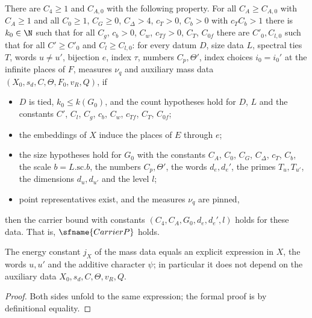 \begin{theorem}\label{pf:thmS-carrier:main}
There are $C_4\ge1$ and $C_{A,0}$ with the following property. For all $C_A\ge C_{A,0}$ with $C_A\ge1$ and all $C_0\ge1$,
$C_G\ge0$, $C_\Delta>4$, $c_T>0$, $C_b>0$ with $c_TC_b>1$ there is $k_0\in\N$ such that for all $C_g$, $c_b>0$, $C_w$,
$c_{Tf}>0$, $C_T$, $C_{0f}$ there are $C'_0,C_{l,0}$ such that for all $C'\ge C'_0$ and $C_l\ge C_{l,0}$: for every datum
$D$, size data $L$, spectral ties $T$, words $u\ne u'$, bijection $e$, index $\tau$, numbers $C_p,\Theta'$, index choices
$i_0=i_0'$ at the infinite places of $F$, measures $\nu_q$ and auxiliary mass data $(X_0,s_d,C,\Theta,F_0,v_R,Q)$, if
\begin{itemize}
\item $D$ is tied, $k_0\le k(G_0)$, and the count hypotheses hold for $D$, $L$ and the constants $C'$, $C_l$, $C_g$, $c_b$,
  $C_w$, $c_{Tf}$, $C_T$, $C_{0f}$;
\item the embeddings of $X$ induce the places of $E$ through $e$;
\item the size hypotheses hold for $G_0$ with the constants $C_A$, $C_0$, $C_G$, $C_\Delta$, $c_T$, $C_b$, the scale
  $b=L.\mathrm{sc}.b$, the numbers $C_p,\Theta'$, the words $d_e,d_e'$, the primes $T_u,T_{u'}$, the dimensions
  $d_u,d_{u'}$ and the level $l$;
\item point representatives exist, and the measures $\nu_q$ are pinned,
\end{itemize}
then the carrier bound with constants $(C_4,C_A,G_0,d_e,d_e',l)$ holds for these data. That is, $\sfname{CarrierP}$ holds.
\end{theorem}

\begin{lemma}\label{pf:thmS-carrier:intN}
The energy constant $j_X$ of the mass data equals an explicit expression in $X$, the words $u,u'$ and the additive
character $\psi$; in particular it does not depend
on the auxiliary data $X_0,s_d,C,\Theta,v_R,Q$.
\end{lemma}

\begin{proof}
Both sides unfold to the same expression; the formal proof is by definitional equality.
\end{proof}

